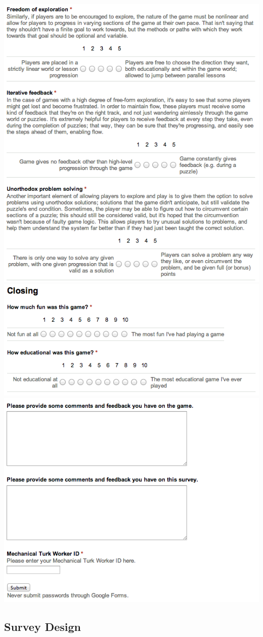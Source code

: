 		\includegraphics[width = \textwidth]{img/survey9.png}
		\includegraphics[width = \textwidth]{img/survey10.png}
		\includegraphics[width = \textwidth]{img/survey11.png}
	\subsection{Survey Design}
	